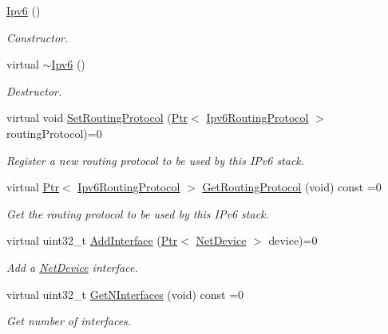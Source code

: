 \begin{DoxyCompactItemize}
\item 
\hyperlink{classns3_1_1Ipv6_adccc58acd14d3f9a28f75dc09e794998}{Ipv6} ()
\begin{DoxyCompactList}\small\item\em Constructor. \end{DoxyCompactList}\item 
virtual \hyperlink{classns3_1_1Ipv6_a9e8db744ad2d252a50b1f19192a22225}{$\sim$\+Ipv6} ()
\begin{DoxyCompactList}\small\item\em Destructor. \end{DoxyCompactList}\item 
virtual void \hyperlink{classns3_1_1Ipv6_aa889d2174527a1df773d65974de83f8f}{Set\+Routing\+Protocol} (\hyperlink{classns3_1_1Ptr}{Ptr}$<$ \hyperlink{classns3_1_1Ipv6RoutingProtocol}{Ipv6\+Routing\+Protocol} $>$ routing\+Protocol)=0
\begin{DoxyCompactList}\small\item\em Register a new routing protocol to be used by this I\+Pv6 stack. \end{DoxyCompactList}\item 
virtual \hyperlink{classns3_1_1Ptr}{Ptr}$<$ \hyperlink{classns3_1_1Ipv6RoutingProtocol}{Ipv6\+Routing\+Protocol} $>$ \hyperlink{classns3_1_1Ipv6_af14dc67ff4c251776e5d0fca16c5cc7c}{Get\+Routing\+Protocol} (void) const =0
\begin{DoxyCompactList}\small\item\em Get the routing protocol to be used by this I\+Pv6 stack. \end{DoxyCompactList}\item 
virtual uint32\+\_\+t \hyperlink{classns3_1_1Ipv6_a4fd7da82c16b8abf9ca15f982918e6a4}{Add\+Interface} (\hyperlink{classns3_1_1Ptr}{Ptr}$<$ \hyperlink{classns3_1_1NetDevice}{Net\+Device} $>$ device)=0
\begin{DoxyCompactList}\small\item\em Add a \hyperlink{classns3_1_1NetDevice}{Net\+Device} interface. \end{DoxyCompactList}\item 
virtual uint32\+\_\+t \hyperlink{classns3_1_1Ipv6_af024eb66563d0958b00ba79ed00b0642}{Get\+N\+Interfaces} (void) const =0
\begin{DoxyCompactList}\small\item\em Get number of interfaces. \end{DoxyCompactList}\item 

\end{DoxyCompactItemize}
